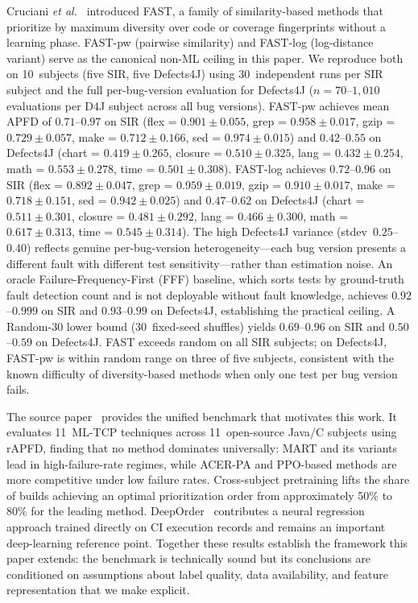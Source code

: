 \documentclass[10pt,conference]{IEEEtran}
\begin{document}
Cruciani \textit{et al.}~\cite{fast} introduced FAST, a family of similarity-based methods that prioritize by maximum diversity over code or coverage fingerprints without a learning phase. FAST-pw (pairwise similarity) and FAST-log (log-distance variant) serve as the canonical non-ML ceiling in this paper. We reproduce both on 10~subjects (five SIR, five Defects4J) using $30$~independent runs per SIR subject and the full per-bug-version evaluation for Defects4J ($n = 70$--$1{,}010$ evaluations per D4J subject across all bug versions). FAST-pw achieves mean APFD of $0.71$--$0.97$ on SIR (flex = $0.901 \pm 0.055$, grep = $0.958 \pm 0.017$, gzip = $0.729 \pm 0.057$, make = $0.712 \pm 0.166$, sed = $0.974 \pm 0.015$) and $0.42$--$0.55$ on Defects4J (chart = $0.419 \pm 0.265$, closure = $0.510 \pm 0.325$, lang = $0.432 \pm 0.254$, math = $0.553 \pm 0.278$, time = $0.501 \pm 0.308$). FAST-log achieves $0.72$--$0.96$ on SIR (flex = $0.892 \pm 0.047$, grep = $0.959 \pm 0.019$, gzip = $0.910 \pm 0.017$, make = $0.718 \pm 0.151$, sed = $0.942 \pm 0.025$) and $0.47$--$0.62$ on Defects4J (chart = $0.511 \pm 0.301$, closure = $0.481 \pm 0.292$, lang = $0.466 \pm 0.300$, math = $0.617 \pm 0.313$, time = $0.545 \pm 0.314$). The high Defects4J variance (stdev~$0.25$--$0.40$) reflects genuine per-bug-version heterogeneity---each bug version presents a different fault with different test sensitivity---rather than estimation noise. An oracle Failure-Frequency-First (FFF) baseline, which sorts tests by ground-truth fault detection count and is not deployable without fault knowledge, achieves $0.92$--$0.999$ on SIR and $0.93$--$0.99$ on Defects4J, establishing the practical ceiling. A Random-30 lower bound (30~fixed-seed shuffles) yields $0.69$--$0.96$ on SIR and $0.50$--$0.59$ on Defects4J. FAST exceeds random on all SIR subjects; on Defects4J, FAST-pw is within random range on three of five subjects, consistent with the known difficulty of diversity-based methods when only one test per bug version fails.

The source paper~\cite{sourcepaper} provides the unified benchmark that motivates this work. It evaluates 11~ML-TCP techniques across 11~open-source Java/C subjects using rAPFD, finding that no method dominates universally: MART and its variants lead in high-failure-rate regimes, while ACER-PA and PPO-based methods are more competitive under low failure rates. Cross-subject pretraining lifts the share of builds achieving an optimal prioritization order from approximately 50\% to 80\% for the leading method. DeepOrder~\cite{deeporder} contributes a neural regression approach trained directly on CI execution records and remains an important deep-learning reference point. Together these results establish the framework this paper extends: the benchmark is technically sound but its conclusions are conditioned on assumptions about label quality, data availability, and feature representation that we make explicit.
\end{document}
